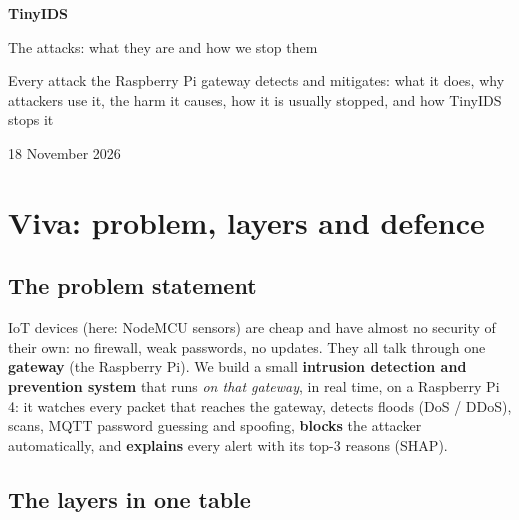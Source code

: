 \documentclass[11pt,a4paper]{article}
\newcommand{\keybox}[1]{\par\smallskip\noindent\colorbox{accent!8}{\parbox{\dimexpr\linewidth-2\fboxsep}{\vspace{0.5em}#1\vspace{0.5em}}}\par\medskip}
\begin{document}
\begin{titlepage}
\centering
\vspace*{4.5cm}
{\Huge\bfseries\color{accent} TinyIDS\par}
\vspace{1.2em}
{\LARGE The attacks: what they are and how we stop them\par}
\vspace{2.5em}
{\large Every attack the Raspberry Pi gateway detects and mitigates: what it does, why attackers use it, the harm it
causes, how it is usually stopped, and how TinyIDS stops it\par}
\vfill
{\large 18 November 2026\par}
\vspace{2cm}
\end{titlepage}

\tableofcontents
\newpage

\section{Viva: problem, layers and defence}

\subsection{The problem statement}

\keybox{IoT devices (here: NodeMCU sensors) are cheap and have almost no security of their own: no firewall, weak
passwords, no updates. They all talk through one \textbf{gateway} (the Raspberry Pi). We build a small
\textbf{intrusion detection and prevention system} that runs \emph{on that gateway}, in real time, on a
Raspberry Pi 4: it watches every packet that reaches the gateway, detects floods (DoS / DDoS), scans, MQTT password
guessing and spoofing, \textbf{blocks} the attacker automatically, and \textbf{explains} every alert with its top-3
reasons (SHAP).}

\subsection{The layers in one table}
\end{document}
